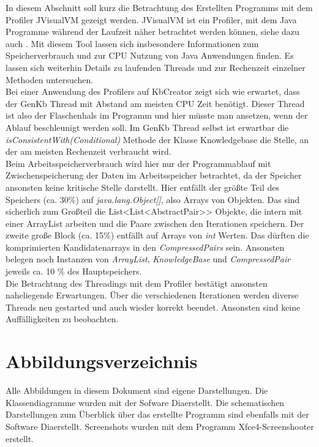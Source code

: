 \documentclass[12pt,a4paper]{article}
\begin{document}
In diesem Abschnitt soll kurz die Betrachtung des Erstellten Programms mit dem Profiler JVisualVM gezeigt werden. JVisualVM ist ein Profiler, mit dem Java Programme während der Laufzeit näher betrachtet werden können, siehe dazu auch \cite{jvis20}. Mit diesem Tool lassen sich insbesondere Informationen zum Speicherverbrauch und zur CPU Nutzung von Java Anwendungen finden. Es lassen sich weiterhin Details zu laufenden Threads und zur Rechenzeit einzelner Methoden untersuchen. \\
Bei einer Anwendung des Profilers auf KbCreator zeigt sich wie erwartet, dass der GenKb Thread mit Abstand am meisten CPU Zeit benötigt. Dieser Thread ist also der Flaschenhals im Programm und hier müsste man ansetzen, wenn der Ablauf beschleunigt werden soll. Im GenKb Thread selbst ist erwartbar die \textit{isConsistentWith(Conditional)} Methode der Klasse Knowledgebase die Stelle, an der am meisten Rechenzeit verbraucht wird. \\
Beim Arbeitsspeicherverbrauch wird hier nur der Programmablauf mit Zwischenspeicherung der Daten im Arbeitsspeicher betrachtet, da der Speicher ansonsten keine kritische Stelle darstellt. Hier entfällt der größte Teil des Speichers (ca. 30$\%$) auf \textit{java.lang.Object[]}, also Arrays von Objekten. Das sind sicherlich zum Großteil die List<List<AbstractPair>> Objekte, die intern mit einer ArrayList arbeiten und die Paare zwischen den Iterationen speichern. Der zweite große Block (ca. 15$\%$) entfällt auf Arrays von \textit{int} Werten. Das dürften die komprimierten Kandidatenarrays in den \textit{CompressedPairs} sein. Ansonsten belegen noch Instanzen von \textit{ArrayList}, \textit{KnowledgeBase} und \textit{CompressedPair} jeweils ca. 10 $\%$ des Hauptspeichers. \\
Die Betrachtung des Threadings mit dem Profiler bestätigt ansonsten naheliegende Erwartungen. Über die verschiedenen Iterationen werden diverse Threads neu gestarted und auch wieder korrekt beendet. Ansonsten sind keine Auffälligkeiten zu beobachten.




\newpage

\section*{Abbildungsverzeichnis}
Alle Abbildungen in diesem Dokument sind eigene Darstellungen. Die Klassendiagramme wurden mit der Sofware \glqq Dia\grqq \space erstellt. Die schematischen Darstellungen zum Überblick über das erstellte Programm sind ebenfalls mit der Software \glqq Dia\grqq \space erstellt. Screenshots  wurden mit dem Programm \glqq Xfce4-Screenshooter \grqq \space erstellt.
 
\end{document}

